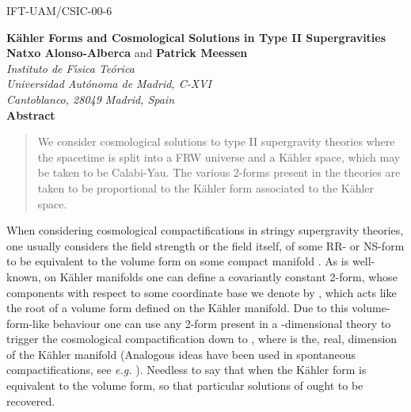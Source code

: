 \documentclass[a4paper,11pt]{article}
\begin{document}
\vspace{-1cm}
\begin{flushright}
IFT-UAM/CSIC-00-6\\
\end{flushright}
\vspace{1cm}
\begin{center}
{\huge\bf
K\"ahler Forms and Cosmological Solutions in Type II Supergravities
}\\[1cm]
%
{\Large {\bf Natxo Alonso-Alberca} and {\bf Patrick Meessen}}\\[.2cm]
{\sl Instituto de F\'{\i}sica Te\'orica\\
Universidad Aut\'onoma de Madrid, C-XVI\\
Cantoblanco, 28049 Madrid, Spain}\\[.5cm]
{\bf Abstract}
\end{center}
\begin{quote}
%
We consider cosmological solutions to type II supergravity theories
where the spacetime is split into a FRW universe and a K\"ahler space,
which may be taken to be Calabi-Yau.
The various 2-forms present in the theories are taken to be proportional 
to the K\"ahler form associated to the K\"ahler space.
%
\end{quote}
When considering cosmological compactifications
in stringy supergravity theories, one usually considers the field strength
or the field itself,
of some RR- or NS-form to be equivalent to the volume form
on some compact manifold \cite{art:Freund,art:LOW,art:LWC}.
As is well-known, on K\"ahler manifolds \cite{art:kaehler}
one can define a covariantly
constant 2-form, whose components with respect to some coordinate base
we denote by \coordHE{}, which acts like the root of a volume
form defined on the K\"ahler manifold.
Due to this volume-form-like behaviour
one can use any 2-form present in a \coordHE{}-dimensional theory
to trigger the cosmological compactification down to \coordHE{}, where 
\coordHE{} is the, real, dimension of the K\"ahler manifold (Analogous
ideas have been used in spontaneous compactifications, see {\em e.g.}
\cite{art:PvN,art:romans}).
Needless to say that when \coordHE{} the K\"ahler form is equivalent 
to the volume form, so that particular solutions of \cite{art:LOW}
ought to be recovered.
\par
\end{document}

